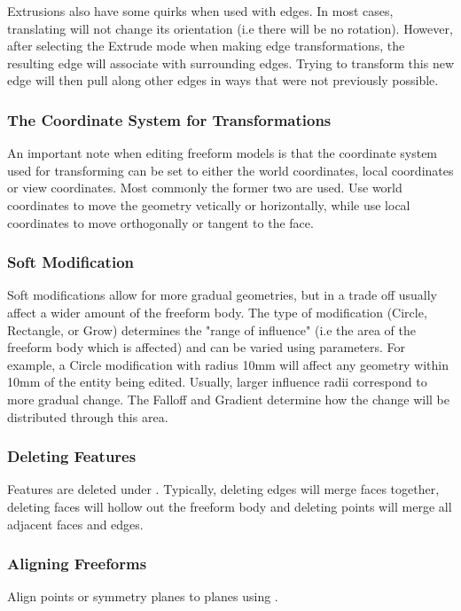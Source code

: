 Extrusions also have some quirks when used with edges. In most cases, translating will not change its orientation (i.e there will be no rotation). However, after selecting the Extrude mode when making edge transformations, the resulting edge will associate with surrounding edges. Trying to transform this new edge will then pull along other edges in ways that were not previously possible. 

\subsubsection{The Coordinate System for Transformations}
An important note when editing freeform models is that the coordinate system used for transforming can be set to either the world coordinates, local coordinates or view coordinates. Most commonly the former two are used. Use world coordinates to move the geometry vetically or horizontally, while use local coordinates to move orthogonally or tangent to the face.

\subsubsection{Soft Modification}
Soft modifications allow for more gradual geometries, but in a trade off usually affect a wider amount of the freeform body. The type of modification (Circle, Rectangle, or Grow) determines the "range of influence" (i.e the area of the freeform body which is affected) and can be varied using parameters. For example, a Circle modification with radius 10mm will affect any geometry within 10mm of the entity being edited. Usually, larger influence radii correspond to more gradual change. The Falloff and Gradient determine how the change will be distributed through this area.

\subsubsection{Deleting Features}
Features are deleted under . Typically, deleting edges will merge faces together, deleting faces will hollow out the freeform body and deleting points will merge all adjacent faces and edges.

\subsubsection{Aligning Freeforms}
Align points or symmetry planes to planes using . 


